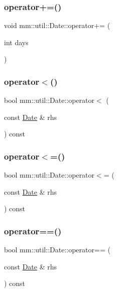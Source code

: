 \subsubsection{\texorpdfstring{operator+=()}{operator+=()}}
{\footnotesize\ttfamily void mm\+::util\+::\+Date\+::operator+= (\begin{DoxyParamCaption}\item[{int}]{days }\end{DoxyParamCaption})}

\mbox{\label{structmm_1_1util_1_1_date_acb395628bc3074f0f5f782e39f7ecbbf}} 
\subsubsection{\texorpdfstring{operator$<$()}{operator<()}}
{\footnotesize\ttfamily bool mm\+::util\+::\+Date\+::operator$<$ (\begin{DoxyParamCaption}\item[{const \mbox{\hyperlink{structmm_1_1util_1_1_date}{Date}} \&}]{rhs }\end{DoxyParamCaption}) const}

\mbox{\label{structmm_1_1util_1_1_date_aec9077b20de935d88cc03e4c454915a3}} 
\subsubsection{\texorpdfstring{operator$<$=()}{operator<=()}}
{\footnotesize\ttfamily bool mm\+::util\+::\+Date\+::operator$<$= (\begin{DoxyParamCaption}\item[{const \mbox{\hyperlink{structmm_1_1util_1_1_date}{Date}} \&}]{rhs }\end{DoxyParamCaption}) const}

\mbox{\label{structmm_1_1util_1_1_date_a55071cbbf31cd8956cd4a7d5116e0d95}} 
\subsubsection{\texorpdfstring{operator==()}{operator==()}}
{\footnotesize\ttfamily bool mm\+::util\+::\+Date\+::operator== (\begin{DoxyParamCaption}\item[{const \mbox{\hyperlink{structmm_1_1util_1_1_date}{Date}} \&}]{rhs }\end{DoxyParamCaption}) const}

